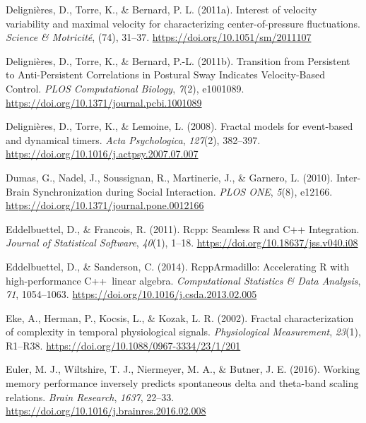 \documentclass[
  man]{apa6}
\newlength{\cslhangindent}
\newlength{\cslentryspacingunit} %
\newenvironment{CSLReferences}[2] %
 {%
  \setlength{\parindent}{0pt}
  \ifodd #1
  \let\oldpar\par
  \def\par{\hangindent=\cslhangindent\oldpar}
  \fi
  \setlength{\parskip}{#2\cslentryspacingunit}
 }%
 {}
\begin{document}
\begin{CSLReferences}{1}{0}
\leavevmode{}%
Delignières, D., Torre, K., \& Bernard, P. L. (2011a). Interest of velocity variability and maximal velocity for characterizing center-of-pressure fluctuations. \emph{Science \& Motricité}, (74), 31--37. \url{https://doi.org/10.1051/sm/2011107}

\leavevmode{}%
Delignières, D., Torre, K., \& Bernard, P.-L. (2011b). Transition from {Persistent} to {Anti}-{Persistent} {Correlations} in {Postural} {Sway} {Indicates} {Velocity}-{Based} {Control}. \emph{PLOS Computational Biology}, \emph{7}(2), e1001089. \url{https://doi.org/10.1371/journal.pcbi.1001089}

\leavevmode{}%
Delignières, D., Torre, K., \& Lemoine, L. (2008). Fractal models for event-based and dynamical timers. \emph{Acta Psychologica}, \emph{127}(2), 382--397. \url{https://doi.org/10.1016/j.actpsy.2007.07.007}

\leavevmode{}%
Dumas, G., Nadel, J., Soussignan, R., Martinerie, J., \& Garnero, L. (2010). Inter-{Brain} {Synchronization} during {Social} {Interaction}. \emph{PLOS ONE}, \emph{5}(8), e12166. \url{https://doi.org/10.1371/journal.pone.0012166}

\leavevmode{}%
Eddelbuettel, D., \& Francois, R. (2011). Rcpp: {Seamless} {R} and {C}++ {Integration}. \emph{Journal of Statistical Software}, \emph{40}(1), 1--18. \url{https://doi.org/10.18637/jss.v040.i08}

\leavevmode{}%
Eddelbuettel, D., \& Sanderson, C. (2014). {RcppArmadillo}: {Accelerating} {R} with high-performance {C}++~linear algebra. \emph{Computational Statistics \& Data Analysis}, \emph{71}, 1054--1063. \url{https://doi.org/10.1016/j.csda.2013.02.005}

\leavevmode{}%
Eke, A., Herman, P., Kocsis, L., \& Kozak, L. R. (2002). Fractal characterization of complexity in temporal physiological signals. \emph{Physiological Measurement}, \emph{23}(1), R1--R38. \url{https://doi.org/10.1088/0967-3334/23/1/201}

\leavevmode{}%
Euler, M. J., Wiltshire, T. J., Niermeyer, M. A., \& Butner, J. E. (2016). Working memory performance inversely predicts spontaneous delta and theta-band scaling relations. \emph{Brain Research}, \emph{1637}, 22--33. \url{https://doi.org/10.1016/j.brainres.2016.02.008}


\end{CSLReferences}
\end{document}
